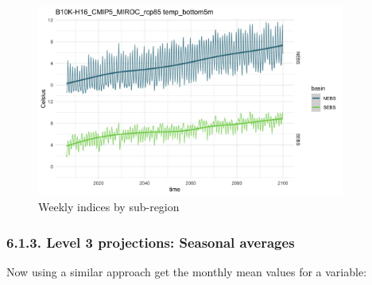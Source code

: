 \documentclass[
]{article}
\begin{document}
\begin{figure}
\centering
\includegraphics[width=0.9\textwidth,height=\textheight]{Figs/weekly_byreg.jpg}
\caption{Weekly indices by sub-region}
\end{figure}

\hypertarget{level-3-projections-seasonal-averages}{%
\subsubsection{6.1.3. Level 3 projections: Seasonal
averages}\label{level-3-projections-seasonal-averages}}

Now using a similar approach get the monthly mean values for a variable:
\end{document}

